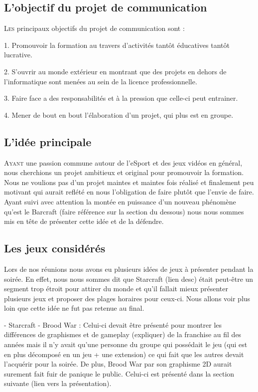 \subsection{L'objectif du projet de communication}%
\label{sub:l_objectif_du_projet_de_communication}

\lettrine{L}{es} principaux objectifs du projet de communication sont :

1. Promouvoir la formation au travers d'activités tantôt éducatives
tantôt lucrative.

2. S'ouvrir au monde extérieur en montrant que des projets en dehors de
l'informatique sont menées au sein de la licence professionnelle.

3. Faire face a des responsabilités et à la pression que celle-ci peut
entrainer.

4. Mener de bout en bout l'élaboration d'un projet, qui plus est en
groupe.

\subsection{L'idée principale}
\label{sub:l_idee_principale}

\lettrine{A}{yant} une passion commune autour de l'eSport et des jeux
vidéos en général, nous cherchions un projet ambitieux et original
pour promouvoir la formation. Nous ne voulions pas d'un projet maintes
et maintes fois réalisé et finalement peu motivant qui aurait
reflété en nous l'obligation de faire plutôt que l'envie de faire.
Ayant suivi avec attention la montée en puissance d'un nouveau
phénomène qu'est le Barcraft (faire référence sur la section du
dessous) nous nous sommes mis en tête de présenter cette idée et de la
défendre.

\subsection{Les jeux considérés}%
\label{sub:les_jeux_consideres}

Lors de nos réunions nous avons eu plusieurs idées de jeux à présenter
pendant la soirée. En effet, nous nous sommes dit que Starcraft (lien
desc) était peut-être un segment trop étroit pour attirer du monde et
qu'il fallait mieux présenter plusieurs jeux et proposer des plages
horaires pour ceux-ci. Nous allons voir plus loin que cette idée ne fut
pas retenue au final.

- Starcraft - Brood War : Celui-ci devait être présenté pour montrer les
différences de graphismes et de gameplay (expliquer) de la franchise au
fil des années mais il n'y avait qu'une personne du groupe qui possédait
le jeu (qui est en plus décomposé en un jeu + une extension) ce qui fait
que les autres devait l'acquérir pour la soirée.  De plus, Brood War par
son graphisme 2D aurait surement fait fuir de panique le public.
Celui-ci est présenté dans la section suivante (lien vers la
présentation).

